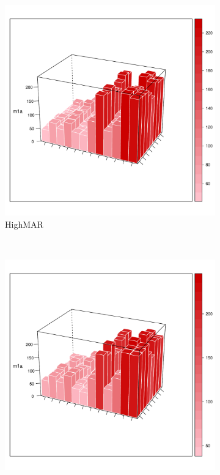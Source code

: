 \documentclass{article}
\begin{document}
			\clearpage
			
					\begin{figure}
						\centering
						\begin{subfigure}[b]{0.45\textwidth}
							\includegraphics[width=\textwidth]{High/MAR.pdf}
							\caption{HighMAR}
							\label{fig:HighMAR}
						\end{subfigure}
						~ %
						\begin{subfigure}[b]{0.45\textwidth}
							\includegraphics[width=\textwidth]{High/MIV.pdf}

\end{subfigure}
\end{figure}
\end{document}
